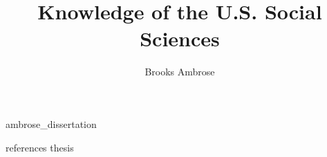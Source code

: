 \documentclass [PhD] {uclathes}
\title          {Knowledge of the U.S. Social Sciences}
\author         {Brooks Ambrose}
\begin{document}
\makeintropages
%
%
 {ambrose_dissertation}                         %

 {references}    %
 {thesis}
\end{document}
